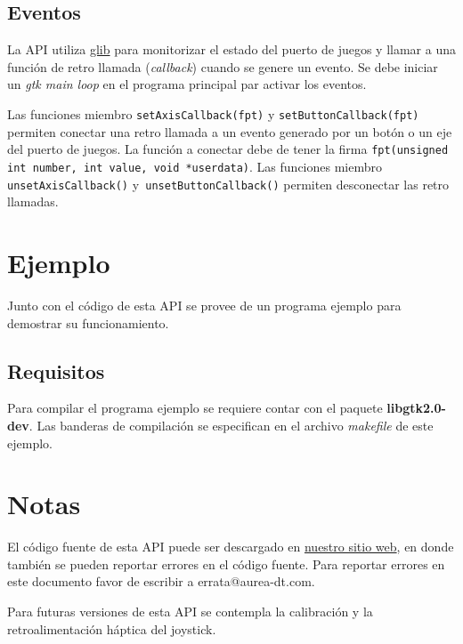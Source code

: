 \documentclass[a4paper,10pt]{article}
\begin{document}
\subsection{Eventos}
La API utiliza \href{http://library.gnome.org/devel/glib/}{glib} para monitorizar el estado del puerto de juegos y llamar a una función de retro llamada (\textit{callback}) cuando se genere un evento. Se debe iniciar un \textit{gtk main loop} en el programa principal par 
activar los eventos.

Las funciones miembro \texttt{setAxisCallback(fpt)} y \texttt{setButtonCallback(fpt)} permiten conectar una retro llamada a un evento generado por un botón o un eje del puerto de juegos. La función a conectar debe de tener la firma \texttt{fpt(unsigned int number, int value, void *userdata)}. Las funciones miembro \texttt{unsetAxisCallback()} y\texttt{ unsetButtonCallback()} permiten desconectar las retro llamadas.

\section{Ejemplo}
\label{ejemplo}
  Junto con el código de esta API se provee de un programa ejemplo para demostrar su funcionamiento.

  \subsection{Requisitos}
  Para compilar el programa ejemplo se requiere contar con el paquete \textbf{libgtk2.0-dev}. Las banderas de compilación se especifican en el archivo \textit{makefile} de este ejemplo.

\section{Notas}
\label{notas}
El código fuente de esta API puede ser descargado en \href{http://www.aurea-dt.com/Software/joystickAPI.php}{nuestro sitio web}, en donde también se pueden reportar errores en el código fuente. Para reportar errores en este documento favor de escribir a errata@aurea-dt.com.

Para futuras versiones de esta API se contempla la calibración  y la retroalimentación háptica del joystick.



%
\end{document}
